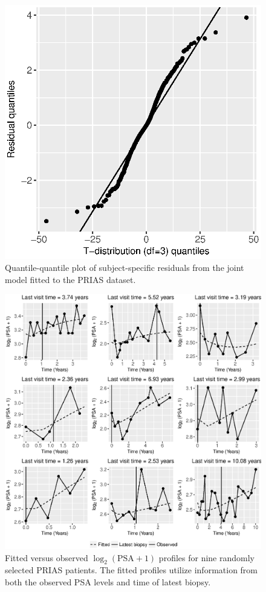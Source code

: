 \begin{figure}[!htb]
\centerline{\includegraphics[width=0.5\columnwidth]{images/model_fit/qqplot_t3_log2psa_plus1.eps}}
\caption{Quantile-quantile plot of subject-specific residuals from the joint model fitted to the PRIAS dataset.}
\label{fig : qqplot_t3_log2psa_plus1}
\end{figure}


\begin{figure}[!htb]
	\centerline{\includegraphics[width=\columnwidth]{images/model_fit/fitted_log2psaplus1_9random_patients.eps}}
	\caption{Fitted versus observed $\log_2 (\mbox{PSA} + 1)$ profiles for nine randomly selected PRIAS patients. The fitted profiles utilize information from both the observed PSA levels and time of latest biopsy.}
	\label{fig : subject_fittedVsObserved_psa_t3}
	\end{figure}

